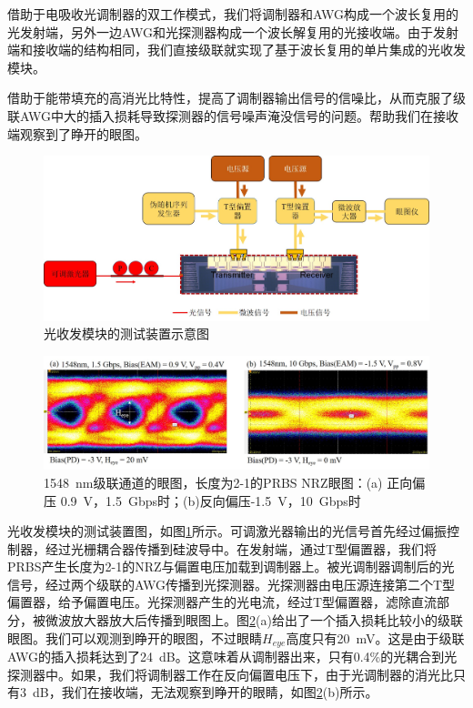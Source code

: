 借助于电吸收光调制器的双工作模式，我们将调制器和AWG构成一个波长复用的光发射端，另外一边AWG和光探测器构成一个波长解复用的光接收端。由于发射端和接收端的结构相同，我们直接级联就实现了基于波长复用的单片集成的光收发模块。

借助于能带填充的高消光比特性，提高了调制器输出信号的信噪比，从而克服了级联AWG中大的插入损耗导致探测器的信号噪声淹没信号的问题。帮助我们在接收端观察到了睁开的眼图。

\begin{figure}[htb]
	\centering
	\includegraphics[width=15cm]{./Pictures/chapt4_tranciever_measure.jpg}
	\caption{光收发模块的测试装置示意图}
	\label{chapt4_tranciever_measure}
\end{figure}

\begin{figure}[htb]
	\centering
	\includegraphics[width=15cm]{./Pictures/chapt4_cascade_eyediagram.jpg}
	\caption{1548~nm级联通道的眼图，长度为2-1的PRBS NRZ眼图：(a) 正向偏压 0.9~V，1.5~Gbps时；(b)反向偏压-1.5~V，10~Gbps时}
	\label{chapt4_cascade_eyediagram}
\end{figure}

光收发模块的测试装置图，如图\ref{chapt4_tranciever_measure}所示。可调激光器输出的光信号首先经过偏振控制器，经过光栅耦合器传播到硅波导中。在发射端，通过T型偏置器，我们将PRBS产生长度为2-1的NRZ与偏置电压加载到调制器上。被光调制器调制后的光信号，经过两个级联的AWG传播到光探测器。光探测器由电压源连接第二个T型偏置器，给予偏置电压。光探测器产生的光电流，经过T型偏置器，滤除直流部分，被微波放大器放大后传播到眼图上。图\ref{chapt4_cascade_eyediagram}(a)给出了一个插入损耗比较小的级联眼图。我们可以观测到睁开的眼图，不过眼睛$H_{eye}$高度只有20~mV。这是由于级联AWG的插入损耗达到了24~dB。这意味着从调制器出来，只有0.4\%的光耦合到光探测器中。如果，我们将调制器工作在反向偏置电压下，由于光调制器的消光比只有3~dB，我们在接收端，无法观察到睁开的眼睛，如图\ref{chapt4_cascade_eyediagram}(b)所示。

